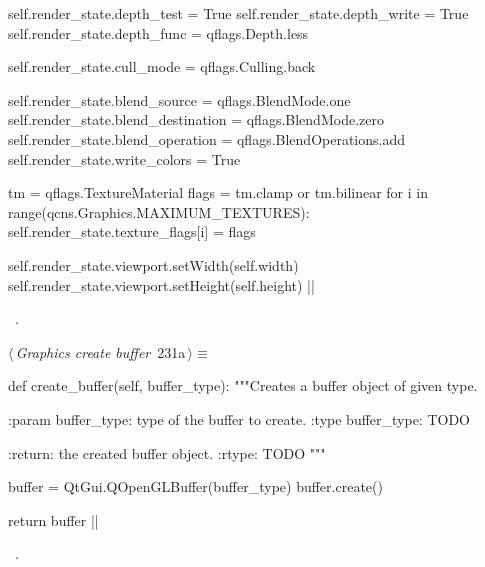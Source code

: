 \documentclass[%
    a4paper,    %
    justified,  %
    nobib,      %
    openany     %
]{tufte-book}
\makeatletter
\renewcommand{\label}[1]{\@tufte@label{##1}}%
\makeatother
\begin{document}
\begin{fullwidth}
\begin{flushleft}
\begin{minipage}{\linewidth}
\begin{pythoncode}
    self.render_state.depth_test = True
    self.render_state.depth_write = True
    self.render_state.depth_func = qflags.Depth.less

    self.render_state.cull_mode = qflags.Culling.back

    self.render_state.blend_source      = qflags.BlendMode.one
    self.render_state.blend_destination = qflags.BlendMode.zero
    self.render_state.blend_operation   = qflags.BlendOperations.add
    self.render_state.write_colors      = True

    tm = qflags.TextureMaterial
    flags = tm.clamp or tm.bilinear
    for i in range(qcns.Graphics.MAXIMUM_TEXTURES):
        self.render_state.texture_flags[i] = flags

    self.render_state.viewport.setWidth(self.width)
    self.render_state.viewport.setHeight(self.height)
|\NWsep|
\end{pythoncode}
\vspace{1.5ex}
\footnotesize
\begin{list}{}{\setlength{\itemsep}{-\parsep}\setlength{\itemindent}{-\leftmargin}}
\item \NWtxtMacroRefIn\ .

\item{}
\end{list}
\end{minipage}\vspace{4ex}
\end{flushleft}
\begin{flushleft} \small
\begin{minipage}{\linewidth}\label{scrap242}\raggedright\small
{} $\langle\,${\itshape Graphics create buffer}\nobreak\ {\footnotesize {231a}}$\,\rangle\equiv$
\vspace{-1ex}
\begin{pythoncode}
def create_buffer(self, buffer_type):
    """Creates a buffer object of given type.

    :param buffer_type: type of the buffer to create.
    :type  buffer_type: TODO

    :return: the created buffer object.
    :rtype:  TODO
    """

    buffer = QtGui.QOpenGLBuffer(buffer_type)
    buffer.create()

    return buffer
|\NWsep|
\end{pythoncode}
\vspace{1.5ex}
\footnotesize
\begin{list}{}{\setlength{\itemsep}{-\parsep}\setlength{\itemindent}{-\leftmargin}}
\item \NWtxtMacroRefIn\ .


\end{list}
\end{minipage}
\end{flushleft}
\end{fullwidth}
\end{document}
